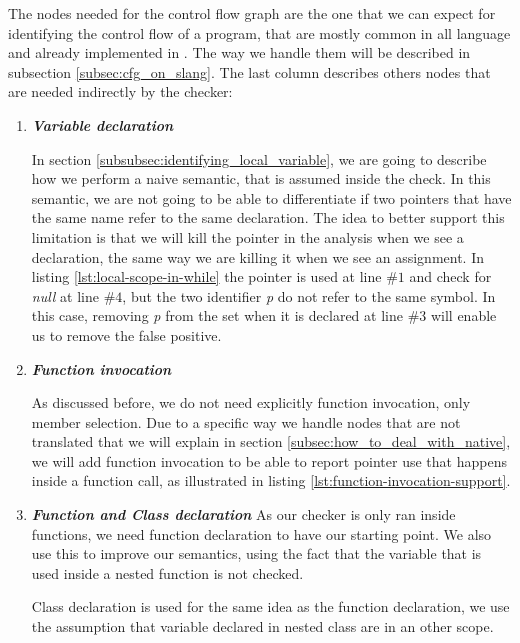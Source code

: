 The nodes needed for the control flow graph are the one that we can expect for identifying the control flow of a program, that are mostly common in all language and already implemented in \slang{}. 
The way we handle them will be described in subsection \ref{subsec:cfg_on_slang}.
The last column describes others nodes that are needed indirectly by the checker:
\begin{enumerate}
	\item \textbf{\textit{Variable declaration}} \newline
	
	
	In section \ref{subsubsec:identifying_local_variable}, we are going to describe how we perform a naive semantic, that is assumed inside the check.
	In this semantic, we are not going to be able to differentiate if two pointers that have the same name refer to the same declaration.
	The idea to better support this limitation is that we will kill the pointer in the analysis when we see a declaration, the same way we are killing it when we see an assignment.
	In listing \ref{lst:local-scope-in-while} the pointer is used at line $\#1$ and check for \emph{null} at line $\#4$, but the two identifier \emph{p} do not refer to the same symbol.
	In this case, removing \emph{p} from the set when it is declared at line $\#3$ will enable us to remove the false positive.
	
	\item \textbf{\textit{Function invocation}} \newline
	
	
	As discussed before, we do not need explicitly function invocation, only member selection. 
	Due to a specific way we handle nodes that are not translated that we will explain in section \ref{subsec:how_to_deal_with_native}, we will add function invocation to be able to report pointer use that happens inside a function call, as illustrated in listing \ref{lst:function-invocation-support}.
	
	\item \textbf{\textit{Function and Class declaration}} \newline
	As our checker is only ran inside functions, we need function declaration to have our starting point. 
	We also use this to improve our semantics, using the fact that the variable that is used inside a nested function is not checked.
	
	Class declaration is used for the same idea as the function declaration, we use the assumption that variable declared in nested class are in an other scope.
\end{enumerate}

